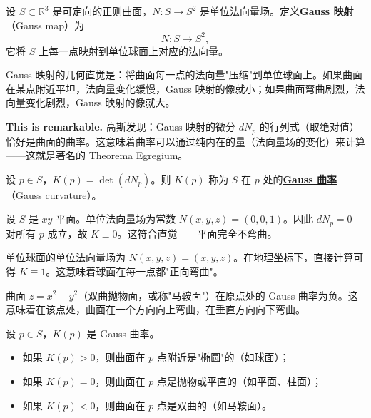 \begin{Definition}[Gauss 映射]\label{def:gauss-map}
设 $S \subset \mathbb{R}^3$ 是可定向的正则曲面，$N: S \to S^2$ 是单位法向量场。定义\textbf{\underline{Gauss 映射}}（Gauss map）为
\[
N: S \to S^2,
\]
它将 $S$ 上每一点映射到单位球面上对应的法向量。
\end{Definition}

Gauss 映射的几何直觉是：将曲面每一点的法向量"压缩"到单位球面上。如果曲面在某点附近平坦，法向量变化缓慢，Gauss 映射的像就小；如果曲面弯曲剧烈，法向量变化剧烈，Gauss 映射的像就大。

\textbf{This is remarkable.} 高斯发现：Gauss 映射的微分 $dN_p$ 的行列式（取绝对值）恰好是曲面的曲率。这意味着曲率可以通过纯内在的量（法向量场的变化）来计算——这就是著名的 Theorema Egregium。

\begin{Definition}[Gauss 曲率]\label{def:gauss-curvature}
设 $p \in S$，$K(p) = \det(dN_p)$。则 $K(p)$ 称为 $S$ 在 $p$ 处的\textbf{\underline{Gauss 曲率}}（Gauss curvature）。
\end{Definition}

\begin{Example}[平面的曲率为零]\label{ex:plane-curvature}
设 $S$ 是 $xy$ 平面。单位法向量场为常数 $N(x,y,z) = (0,0,1)$。因此 $dN_p = 0$ 对所有 $p$ 成立，故 $K \equiv 0$。这符合直觉——平面完全不弯曲。
\end{Example}

\begin{Example}[球面的曲率为正]\label{ex:sphere-curvature}
单位球面的单位法向量场为 $N(x,y,z) = (x,y,z)$。在地理坐标下，直接计算可得 $K \equiv 1$。这意味着球面在每一点都"正向弯曲"。
\end{Example}

\begin{Example}[马鞍面的曲率为负]\label{ex:saddle-curvature}
曲面 $z = x^2 - y^2$（双曲抛物面，或称"马鞍面"）在原点处的 Gauss 曲率为负。这意味着在该点处，曲面在一个方向向上弯曲，在垂直方向向下弯曲。
\end{Example}

\begin{Proposition}[曲率的符号]\label{prop:curvature-sign}
设 $p \in S$，$K(p)$ 是 Gauss 曲率。
\begin{itemize}
\item 如果 $K(p) > 0$，则曲面在 $p$ 点附近是"椭圆"的（如球面）；
\item 如果 $K(p) = 0$，则曲面在 $p$ 点是抛物或平直的（如平面、柱面）；
\item 如果 $K(p) < 0$，则曲面在 $p$ 点是双曲的（如马鞍面）。
\end{itemize}
\end{Proposition}

